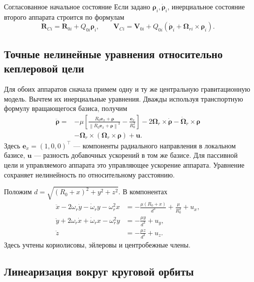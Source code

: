 \documentclass[a4paper,11pt]{article}
\numberwithin{equation}{section}
\theoremstyle{remark}
\newcommand{\vect}[1]{\boldsymbol{#1}}
\newcommand{\norm}[1]{\left\lVert#1\right\rVert}
\begin{document}
\begin{explanation}{Согласованное начальное состояние}
Если задано $\vect\rho_i,\dot{\vect\rho}_i$, инерциальное
состояние второго аппарата строится по формулам
\[
 \vect R_{Ci}=\vect R_{0i}+Q_{0i}\vect\rho_i,\qquad
 \vect V_{Ci}=\vect V_{0i}
 +Q_{0i}(\dot{\vect\rho}_i+
                \vect\Omega_{ri}\times\vect\rho_i).
\]
\end{explanation}

\subsection{Точные нелинейные уравнения относительно кеплеровой цели}

Для обоих аппаратов сначала примем одну и ту же центральную
гравитационную модель. Вычтем их инерциальные уравнения.
Дважды используя транспортную формулу вращающегося базиса,
получим
\begin{equation}
 \begin{aligned}
 \ddot{\vect\rho}={}&-\mu\left[
 \frac{R_0\vect e_x+\vect\rho}
      {\norm{R_0\vect e_x+\vect\rho}^3}
       -\frac{\vect e_x}{R_0^2}\right]
 -2\vect\Omega_r\times\dot{\vect\rho}
 -\dot{\vect\Omega}_r\times\vect\rho\\
 &-\vect\Omega_r\times(\vect\Omega_r\times\vect\rho)
 +\vect u.
 \end{aligned}
 \label{eq:exact-relative}
\end{equation}
Здесь $\vect e_x=(1,0,0)^\top$ --- компоненты радиального
направления в локальном базисе, $\vect u$ --- разность
добавочных ускорений в том же базисе. Для пассивной цели
и управляемого аппарата это управляющее ускорение аппарата.
Уравнение сохраняет нелинейность по относительному расстоянию.

Положим $d=\sqrt{(R_0+x)^2+y^2+z^2}$. В компонентах
\begin{equation}
 \begin{aligned}
 \ddot x-2\omega_r\dot y-\dot\omega_r y-\omega_r^2x
   &=-\frac{\mu(R_0+x)}{d^3}+\frac{\mu}{R_0^2}+u_x,\\
 \ddot y+2\omega_r\dot x+\dot\omega_r x-\omega_r^2y
   &=-\frac{\mu y}{d^3}+u_y,\\
 \ddot z&=-\frac{\mu z}{d^3}+u_z.
 \end{aligned}
 \label{eq:exact-relative-components}
\end{equation}
Здесь учтены кориолисовы, эйлеровы и центробежные члены.

\subsection{Линеаризация вокруг круговой орбиты}
\end{document}
